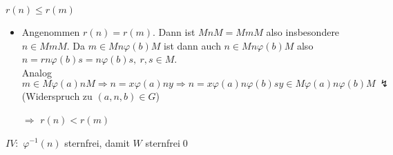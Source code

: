 \begin{itemize}
\begin{itemize}
\begin{itemize}
                    $r(n)\le r(m)$
                    \begin{itemize}
                        \item Angenommen $r(n)=r(m)$. Dann ist $MnM=MmM$ also insbesondere $n\in MmM$. Da $m\in Mn\varphi(b) M$ ist dann auch $n\in Mn\varphi(b)M$ also $n=rn\varphi(b)s=n\varphi(b)s,\ r,s\in M$.\\
                        Analog $m\in M\varphi(a)nM\Rightarrow n=x\varphi(a)ny\Rightarrow n=x\varphi(a)n\varphi(b)sy\in M\varphi(a)n\varphi(b)M\ \lightning$ (Widerspruch zu $(a,n,b)\in G$)
                        \item[$\Rightarrow$] $r(n)<r(m)$
                    \end{itemize}
                    $IV:$ $\varphi^{-1}(n)$ sternfrei, damit $W$ sternfrei\qed
            \end{itemize}
        \end{itemize}
    \end{itemize}
